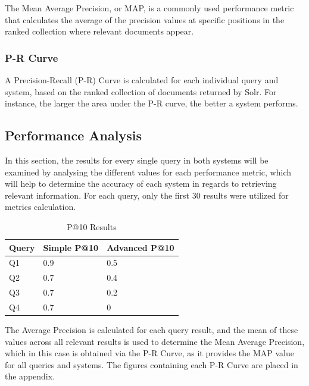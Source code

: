 \documentclass[sigconf]{acmart}
\begin{document}
The Mean Average Precision\cite{map}, or MAP, is a commonly used performance metric that calculates the average of the precision values at specific positions in the ranked collection where relevant documents appear.

\subsubsection{P-R Curve}

A Precision-Recall (P-R) Curve\cite{prcurves} is calculated for each individual query and system, based on the ranked collection of documents returned by Solr. For instance, the larger the area under the P-R curve\cite{auc}, the better a system performs.

\subsection{Performance Analysis}

In this section, the results for every single query in both systems will be examined by analysing the different values for each performance metric, which will help to determine the accuracy of each system in regards to retrieving relevant information. For each query, only the first 30 results were utilized for metrics calculation.\newline

\begin{table}[H]
	\begin{tabular}{ | m{5em} | m{1cm}| m{1.2cm} | }
		\hline
		Query& Simple P@10 & Advanced P@10 \\
		\hline
		Q1 & 0.9 & 0.5 \\
		\hline
		Q2 & 0.7 & 0.4 \\
		\hline
		Q3 & 0.7 & 0.2 \\
		\hline
		Q4 & 0.7 & 0 \\
		\hline
	\end{tabular}
	\caption{P@10 Results}
	\label{tab:pat10_results}
\end{table}
The Average Precision is calculated for each query result, and the mean of these values across all relevant results is used to determine the Mean Average Precision, which in this case is obtained via the P-R Curve, as it provides the MAP value for all queries and systems. The figures containing each P-R Curve are placed in the appendix. \newline
\end{document}
